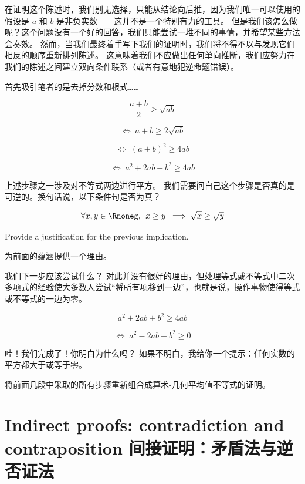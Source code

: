 在证明这个陈述时，我们别无选择，只能从结论向后推，因为我们唯一可以使用的假设是 $a$ 和 $b$ 是非负实数——这并不是一个特别有力的工具。
但是我们该怎么做呢？这个问题没有一个好的回答，我们只能尝试一堆不同的事情，并希望某些方法会奏效。
然而，当我们最终着手写下我们的证明时，我们将不得不以与发现它们相反的顺序重新排列陈述。
这意味着我们不应做出任何单向推断，我们应努力在我们的陈述之间建立双向条件联系（或者有意地犯逆命题错误）。

首先吸引笔者的是去掉分数和根式……

\[ \frac{a+b}{2} \geq \sqrt{ab} \]

\[ \iff \; a+b \geq 2\sqrt{ab} \]

\[ \iff \; (a+b)^2 \geq 4ab \]

\[ \iff \; a^2+2ab+b^2 \geq 4ab \]

上述步骤之一涉及对不等式两边进行平方。
我们需要问自己这个步骤是否真的是可逆的。换句话说，以下条件句是否为真？

\[ \forall x,y \in \Rnoneg, \, \;
      x \geq y \; \implies \sqrt{x} \geq \sqrt{y} \]

\begin{exer}
      Provide a justification for the previous implication.

      为前面的蕴涵提供一个理由。
\end{exer}

我们下一步应该尝试什么？
对此并没有很好的理由，但处理等式或不等式中二次多项式的经验使大多数人尝试“将所有项移到一边”，也就是说，操作事物使得等式或不等式的一边为零。

\[  a^2+2ab+b^2 \geq 4ab \]

\[ \iff \; a^2-2ab+b^2 \geq 0 \]

哇！我们完成了！你明白为什么吗？
如果不明白，我给你一个提示：任何实数的平方都大于或等于零。

\begin{exer}
      将前面几段中采取的所有步骤重新组合成算术-几何平均值不等式的证明。
\end{exer}


\clearpage




\newpage


\section[Contradiction and contraposition 矛盾法与逆否证法]{Indirect proofs: contradiction and contraposition 间接证明：矛盾法与逆否证法}
\label{sec:contra}

